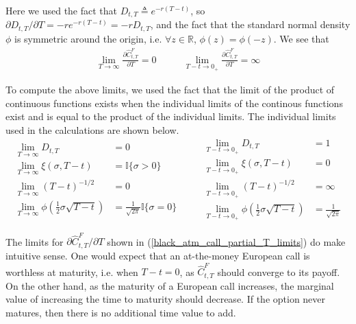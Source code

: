 \documentclass{article}
\numberwithin{equation}{section}
\begin{document}
Here we used the fact that $ D_{t, T} \triangleq e^{-r(T - t)} $, so
$ \partial D_{t, T} / \partial T = -re^{-r(T - t)} = -rD_{t, T} $, and the fact
that the standard normal density $ \phi $ is symmetric around the origin, i.e.
$ \forall z \in \mathbb{R} $, $ \phi(z) = \phi(-z) $. We see that
\begin{equation} \label{black_atm_call_partial_T_limits}
    \begin{array}{cc}
        \displaystyle \lim_{T \rightarrow \infty}
        \frac{\partial\hat{C}_{t, T}^F}{\partial T} = 0 \quad & \quad
        \displaystyle \lim_{T - t \rightarrow 0_+}
        \frac{\partial\hat{C}_{t, T}^F}{\partial T} = \infty
    \end{array}
\end{equation}

To compute the above limits, we used the fact that the limit of the product of
continuous functions exists when the individual limits of the continous
functions exist and is equal to the product of the individual limits. The
individual limits used in the calculations are shown below.
\begin{equation*}
    \begin{split}
        \lim_{T \rightarrow \infty}D_{t, T} & = 0 \\
        \lim_{T \rightarrow \infty}\xi(\sigma, T - t) & =
        \mathbb{I}\{\sigma > 0\} \\
        \lim_{T \rightarrow \infty}(T - t)^{-1 / 2} & = 0 \\
        \lim_{T \rightarrow \infty}\phi\left(
            \frac{1}{2}\sigma\sqrt{T - t}
        \right) & = \frac{1}{\sqrt{2\pi}}\mathbb{I}\{\sigma = 0\}
    \end{split}
    \quad \quad
    \begin{split}
        \lim_{T - t \rightarrow 0_+}D_{t, T} & = 1 \\
        \lim_{T - t \rightarrow 0_+}\xi(\sigma, T - t) & = 0 \\
        \lim_{T - t \rightarrow 0_+}(T - t)^{-1 / 2} & = \infty \\
        \lim_{T - t \rightarrow 0_+}\phi\left(
            \frac{1}{2}\sigma\sqrt{T - t}
        \right) & = \frac{1}{\sqrt{2\pi}}
    \end{split}
\end{equation*}

The limits for $ \partial \hat{C}_{t, T}^F / \partial T $ shown in
(\ref{black_atm_call_partial_T_limits}) do make intuitive sense. One would
expect that an at-the-money European call is worthless at maturity, i.e. when
$ T - t = 0 $, as $ \hat{C}_{t, T}^F $ should converge to its payoff. On the
other hand, as the maturity of a European call increases, the marginal value of
increasing the time to maturity should decrease. If the option never matures,
then there is no additional time value to add.
\end{document}
